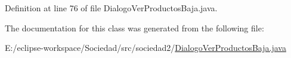 Definition at line 76 of file Dialogo\+Ver\+Productos\+Baja.\+java.



The documentation for this class was generated from the following file\+:\begin{DoxyCompactItemize}
\item 
E\+:/eclipse-\/workspace/\+Sociedad/src/sociedad2/\mbox{\hyperlink{_dialogo_ver_productos_baja_8java}{Dialogo\+Ver\+Productos\+Baja.\+java}}\end{DoxyCompactItemize}
